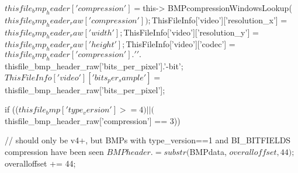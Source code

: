 \begin{DoxyCode}
{{                        $thisfile_bmp_header['compression'] = $this->
      BMPcompressionWindowsLookup($thisfile_bmp_header_raw['compression']);
                        $ThisFileInfo['video']['resolution_x']    = 
      $thisfile_bmp_header_raw['width'];
                        $ThisFileInfo['video']['resolution_y']    = 
      $thisfile_bmp_header_raw['height'];
                        $ThisFileInfo['video']['codec']           = 
      $thisfile_bmp_header['compression'].' '.$thisfile_bmp_header_raw['bits_per_pixel'].'-bit';
                        $ThisFileInfo['video']['bits_per_sample'] = 
      $thisfile_bmp_header_raw['bits_per_pixel'];

                        if (($thisfile_bmp['type_version'] >= 4) || (
      $thisfile_bmp_header_raw['compression'] == 3)) {
                                // should only be v4+, but BMPs with
       type_version==1 and BI_BITFIELDS compression have been seen
                                $BMPheader .= substr($BMPdata, $overalloffset, 
      44);
                                $overalloffset += 44;

}}}
\end{DoxyCode}
